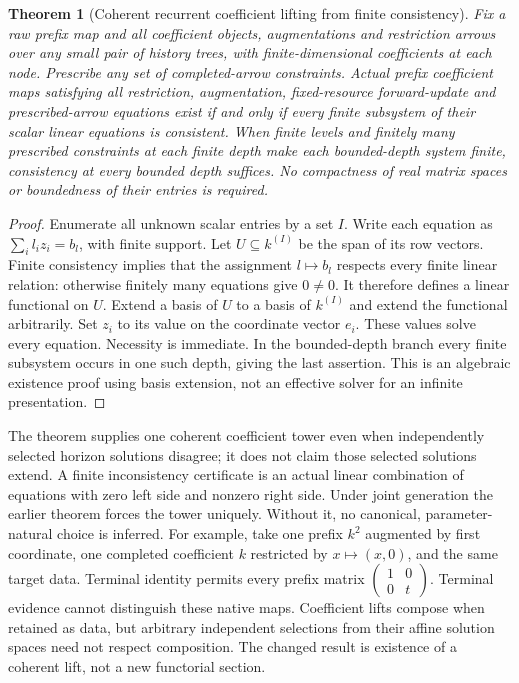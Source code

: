 \documentclass{article}
\newtheorem{theorem}{Theorem}\newtheorem{proposition}{Proposition}
\begin{document}
\begin{theorem}[Coherent recurrent coefficient lifting from finite consistency]
Fix a raw prefix map and all coefficient objects, augmentations and restriction arrows over any small pair of history trees, with finite-dimensional coefficients at each node. Prescribe any set of completed-arrow constraints. Actual prefix coefficient maps satisfying all restriction, augmentation, fixed-resource forward-update and prescribed-arrow equations exist if and only if every finite subsystem of their scalar linear equations is consistent. When finite levels and finitely many prescribed constraints at each finite depth make each bounded-depth system finite, consistency at every bounded depth suffices. No compactness of real matrix spaces or boundedness of their entries is required.
\end{theorem}
\begin{proof}
Enumerate all unknown scalar entries by a set $I$. Write each equation as $\sum_i l_i z_i=b_l$, with finite support. Let $U\subseteq k^{(I)}$ be the span of its row vectors. Finite consistency implies that the assignment $l\mapsto b_l$ respects every finite linear relation: otherwise finitely many equations give $0\ne0$. It therefore defines a linear functional on $U$. Extend a basis of $U$ to a basis of $k^{(I)}$ and extend the functional arbitrarily. Set $z_i$ to its value on the coordinate vector $e_i$. These values solve every equation. Necessity is immediate. In the bounded-depth branch every finite subsystem occurs in one such depth, giving the last assertion. This is an algebraic existence proof using basis extension, not an effective solver for an infinite presentation.\end{proof}

The theorem supplies one coherent coefficient tower even when independently selected horizon solutions disagree; it does not claim those selected solutions extend. A finite inconsistency certificate is an actual linear combination of equations with zero left side and nonzero right side. Under joint generation the earlier theorem forces the tower uniquely. Without it, no canonical, parameter-natural choice is inferred. For example, take one prefix $k^2$ augmented by first coordinate, one completed coefficient $k$ restricted by $x\mapsto(x,0)$, and the same target data. Terminal identity permits every prefix matrix $\left(\begin{smallmatrix}1&0\\0&t\end{smallmatrix}\right)$. Terminal evidence cannot distinguish these native maps. Coefficient lifts compose when retained as data, but arbitrary independent selections from their affine solution spaces need not respect composition. The changed result is existence of a coherent lift, not a new functorial section.
\end{document}
